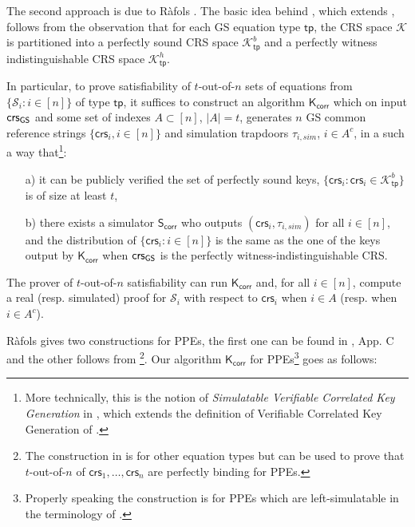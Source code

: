 The second approach is due to R\`afols \cite{TCC:Rafols15}. The basic idea behind \cite{TCC:Rafols15}, which extends \cite{C:GroOstSah06}, follows from the observation that for each GS equation type 
$\mathsf{tp}$,  the CRS space $\mathcal{K}$ is partitioned into a perfectly sound CRS space $\mathcal{K}^b_\mathsf{tp}$ and a perfectly witness indistinguishable CRS space $\mathcal{K}^{h}_\mathsf{tp}$.

In particular, to prove satisfiability of $t$-out-of-$n$ sets of equations from $\{\mathcal{S}_i:i\in[n]\}$ of type $\mathsf{tp}$, it suffices to construct an algorithm $\mathsf{K}_{\mathsf{corr}}$ which on input
$\mathsf{crs}_{{\mathsf{GS}}}$ and some set of indexes $A \subset [n]$, $|A|=t$, generates $n$ GS common reference strings 
$\{\mathsf{crs}_i, i \in [n]\}$ and simulation trapdoors $\tau_{i,sim}$, $i \in A^c$, in a such a way that\footnote{More technically, this is the notion of \textit{Simulatable Verifiable Correlated Key Generation} in \cite{TCC:Rafols15}, which extends the definition of Verifiable Correlated Key Generation of \cite{C:GroOstSah06}.}:
\begin{itemize}
\item[a)] it can be publicly verified the set of perfectly sound keys, 
$\{\mathsf{crs}_i : \mathsf{crs}_i \in \mathcal{K}_{\mathsf{tp}}^{b}\}$ is of size at least $t$,
\item [b)] there exists a simulator $\mathsf{S}_{\mathsf{corr}}$ who outputs $(\mathsf{crs}_i,\tau_{i,sim})$ for all $i \in [n]$, and the distribution of $\{\mathsf{crs}_i : i \in [n]\}$ is the same as the one of the keys  output by $\mathsf{K}_{\mathsf{corr}}$ when $\mathsf{crs}_{{\mathsf{GS}}}$ is the perfectly witness-indistinguishable CRS.
\end{itemize}
The prover of $t$-out-of-$n$ satisfiability can run $\mathsf{K}_{\mathsf{corr}}$ and, for all $i \in [n]$, compute a real (resp. simulated) proof for 
$\mathcal{S}_i$ with respect to $\mathsf{crs}_i$
when $i \in A$ (resp. when $i \in A^c$).

R\`afols gives two constructions for PPEs, the first one can be found in \cite{TCC:Rafols15}, App. C and the other follows from \cite[Section~7]{TCC:Rafols15}\footnote{The construction in \cite[Section~7]{TCC:Rafols15} is for other equation types but can be used to prove that $t$-out-of-$n$ of $\mathsf{crs}_1,\ldots,\mathsf{crs}_n$ are perfectly binding for PPEs.
}. 
Our algorithm $\mathsf{K}_\mathsf{corr}$ for PPEs\footnote{Properly speaking the construction is for PPEs which are left-simulatable in the terminology of \cite{TCC:Rafols15}.} goes as follows:

